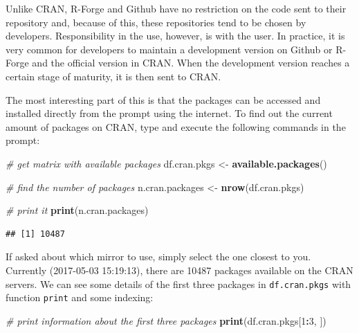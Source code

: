 \documentclass[11pt,]{book}
\newenvironment{Shaded}{\begin{snugshade}}{\end{snugshade}}
\newcommand{\KeywordTok}[1]{\textcolor[rgb]{0.27,0.27,0.27}{\textbf{#1}}}
\newcommand{\DecValTok}[1]{\textcolor[rgb]{0.06,0.06,0.06}{#1}}
\newcommand{\StringTok}[1]{\textcolor[rgb]{0.5,0.5,0.5}{#1}}
\newcommand{\CommentTok}[1]{\textcolor[rgb]{0.56,0.35,0.01}{\textit{#1}}}
\newcommand{\OperatorTok}[1]{\textcolor[rgb]{0.81,0.36,0.00}{\textbf{#1}}}
\newcommand{\NormalTok}[1]{#1}
\begin{document}
Unlike CRAN, R-Forge and Github have no restriction on the code sent to
their repository and, because of this, these repositories tend to be
chosen by developers. Responsibility in the use, however, is with the
user. In practice, it is very common for developers to maintain a
development version on Github or R-Forge and the official version in
CRAN. When the development version reaches a certain stage of maturity,
it is then sent to CRAN.

The most interesting part of this is that the packages can be accessed
and installed directly from the prompt using the internet. To find out
the current amount of packages on CRAN, type and execute the following
commands in the prompt:

\begin{Shaded}
\begin{Highlighting}[]
\CommentTok{# get matrix with available packages}
\NormalTok{df.cran.pkgs <-}\StringTok{ }\KeywordTok{available.packages}\NormalTok{()}

\CommentTok{# find the number of packages}
\NormalTok{n.cran.packages <-}\StringTok{ }\KeywordTok{nrow}\NormalTok{(df.cran.pkgs)}

\CommentTok{# print it}
\KeywordTok{print}\NormalTok{(n.cran.packages)}
\end{Highlighting}
\end{Shaded}

\begin{verbatim}
## [1] 10487
\end{verbatim}

If asked about which mirror to use, simply select the one closest to
you. Currently (2017-05-03 15:19:13), there are 10487 packages available
on the CRAN servers. We can see some details of the first three packages
in \texttt{df.cran.pkgs} with function \texttt{print} and some indexing:

\begin{Shaded}
\begin{Highlighting}[]
\CommentTok{# print information about the first three packages}
\KeywordTok{print}\NormalTok{(df.cran.pkgs[}\DecValTok{1}\OperatorTok{:}\DecValTok{3}\NormalTok{, ])}
\end{Highlighting}
\end{Shaded}
\end{document}
